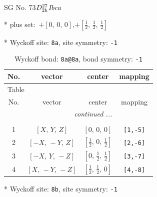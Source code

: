 \documentclass[fleqn,8pt]{jsarticle}
\begin{document}
\setcounter{MaxMatrixCols}{32}

\renewcommand{\tablename}{Table~}
\renewcommand{\figurename}{Figure~}
\begin{center}
\LARGE
SG No. 73\quad$D_{\rm 2h}^{27}$\quad$Ibca$\quad[ orthorhombic ]
\end{center}

* plus set:\,\,\,$+\left[ 0,\, 0,\, 0 \right]$,\quad $+\left[ \frac{1}{2},\, \frac{1}{2},\, \frac{1}{2} \right]$


* Wyckoff site: {\tt 8a}, site symmetry: {\tt -1}
\renewcommand{\arraystretch}{1.2}
\begin{longtable}{cccc}
\caption{Wyckoff bond: {\tt 8a@8a}, bond symmetry: {\tt -1}}
 \\
 \hline \hline
No. & vector & center & mapping \\ \hline \endfirsthead

\multicolumn{3}{l}{\tablename\ \thetable{}} \\
 \hline \hline
No. & vector & center & mapping \\ \hline \endhead

 \hline \hline
\multicolumn{3}{r}{\footnotesize\it continued ...} \\ \endfoot

 \hline \hline
\multicolumn{3}{r}{} \\ \endlastfoot

1 & $\left[ X,\, Y,\, Z \right]$ & $\left[ 0,\, 0,\, 0 \right]$ & {\tt [1,-5]} \\ \hline
2 & $\left[ - X,\, - Y,\, Z \right]$ & $\left[ \frac{1}{2},\, 0,\, \frac{1}{2} \right]$ & {\tt [2,-6]} \\ \hline
3 & $\left[ - X,\, Y,\, - Z \right]$ & $\left[ 0,\, \frac{1}{2},\, \frac{1}{2} \right]$ & {\tt [3,-7]} \\ \hline
4 & $\left[ X,\, - Y,\, - Z \right]$ & $\left[ \frac{1}{2},\, \frac{1}{2},\, 0 \right]$ & {\tt [4,-8]} \\
\end{longtable}
* Wyckoff site: {\tt 8b}, site symmetry: {\tt -1}
\renewcommand{\arraystretch}{1.2}
\end{document}
